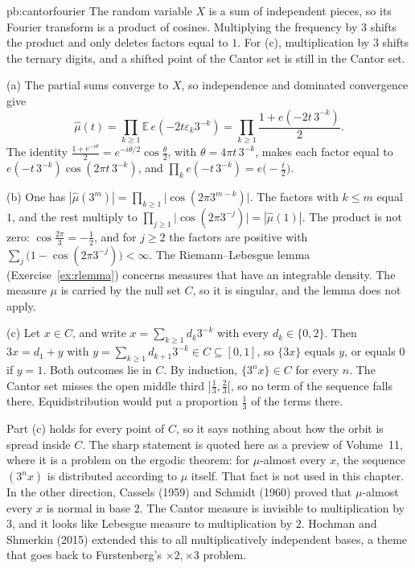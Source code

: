 \begin{solution}{pb:cantorfourier}
\idea The random variable $X$ is a sum of independent pieces, so its Fourier transform is a product of cosines. Multiplying the frequency by $3$ shifts the product and only deletes factors equal to $1$. For (c), multiplication by $3$ shifts the ternary digits, and a shifted point of the Cantor set is still in the Cantor set.

\writeup (a) The partial sums converge to $X$, so independence and dominated convergence give
\[
\hat\mu(t)=\prod_{k\ge 1}\mathbb E\, e(-2t\varepsilon_k 3^{-k})=\prod_{k\ge 1}\frac{1+e(-2t\,3^{-k})}2.
\]
The identity $\frac{1+e^{-i\theta}}2=e^{-i\theta/2}\cos\frac\theta2$, with $\theta=4\pi t\,3^{-k}$, makes each factor equal to $e(-t\,3^{-k})\cos(2\pi t\,3^{-k})$, and $\prod_k e(-t\,3^{-k})=e\bigl(-\frac t2\bigr)$.

(b) One has $|\hat\mu(3^m)|=\prod_{k\ge 1}\bigl|\cos(2\pi 3^{m-k})\bigr|$. The factors with $k\le m$ equal $1$, and the rest multiply to $\prod_{j\ge 1}\bigl|\cos(2\pi 3^{-j})\bigr|=|\hat\mu(1)|$. The product is not zero: $\cos\frac{2\pi}3=-\frac12$, and for $j\ge 2$ the factors are positive with $\sum_j\bigl(1-\cos(2\pi 3^{-j})\bigr)<\infty$. The Riemann--Lebesgue lemma (Exercise~\ref{ex:rlemma}) concerns measures that have an integrable density. The measure $\mu$ is carried by the null set $C$, so it is singular, and the lemma does not apply.

(c) Let $x\in C$, and write $x=\sum_{k\ge 1}d_k 3^{-k}$ with every $d_k\in\{0,2\}$. Then $3x=d_1+y$ with $y=\sum_{k\ge 1}d_{k+1}3^{-k}\in C\subseteq[0,1]$, so $\{3x\}$ equals $y$, or equals $0$ if $y=1$. Both outcomes lie in $C$. By induction, $\{3^nx\}\in C$ for every $n$. The Cantor set misses the open middle third $\bigl]\frac13,\frac23\bigr[$, so no term of the sequence falls there. Equidistribution would put a proportion $\frac13$ of the terms there.

\leads Part (c) holds for every point of $C$, so it says nothing about how the orbit is spread inside $C$. The sharp statement is quoted here as a preview of Volume~11, where it is a problem on the ergodic theorem: for $\mu$-almost every $x$, the sequence $(3^nx)$ is distributed according to $\mu$ itself. That fact is not used in this chapter. In the other direction, Cassels (1959) and Schmidt (1960) proved that $\mu$-almost every $x$ is normal in base $2$. The Cantor measure is invisible to multiplication by $3$, and it looks like Lebesgue measure to multiplication by $2$. Hochman and Shmerkin (2015) extended this to all multiplicatively independent bases, a theme that goes back to Furstenberg's $\times 2,\times 3$ problem.
\end{solution}

